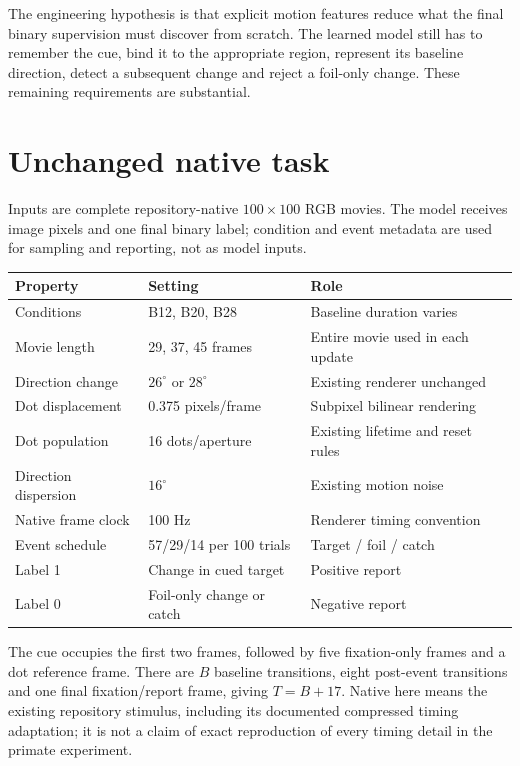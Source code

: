 \documentclass[11pt]{article}
\begin{document}
The engineering hypothesis is that explicit motion features reduce what the final binary supervision must discover from scratch. The learned model still has to remember the cue, bind it to the appropriate region, represent its baseline direction, detect a subsequent change and reject a foil-only change. These remaining requirements are substantial.

\section{Unchanged native task}

Inputs are complete repository-native $100\times100$ RGB movies. The model receives image pixels and one final binary label; condition and event metadata are used for sampling and reporting, not as model inputs.

\begin{center}
\begin{tabular}{lll}
\toprule
Property & Setting & Role \\
\midrule
Conditions & B12, B20, B28 & Baseline duration varies \\
Movie length & 29, 37, 45 frames & Entire movie used in each update \\
Direction change & $26^\circ$ or $28^\circ$ & Existing renderer unchanged \\
Dot displacement & 0.375 pixels/frame & Subpixel bilinear rendering \\
Dot population & 16 dots/aperture & Existing lifetime and reset rules \\
Direction dispersion & $16^\circ$ & Existing motion noise \\
Native frame clock & 100 Hz & Renderer timing convention \\
Event schedule & 57/29/14 per 100 trials & Target / foil / catch \\
Label 1 & Change in cued target & Positive report \\
Label 0 & Foil-only change or catch & Negative report \\
\bottomrule
\end{tabular}
\end{center}

The cue occupies the first two frames, followed by five fixation-only frames and a dot reference frame. There are $B$ baseline transitions, eight post-event transitions and one final fixation/report frame, giving $T=B+17$. Native here means the existing repository stimulus, including its documented compressed timing adaptation; it is not a claim of exact reproduction of every timing detail in the primate experiment.
\end{document}
